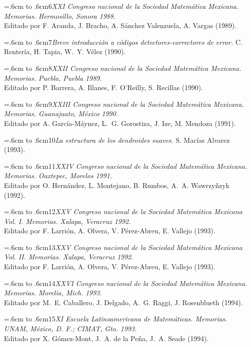 \documentclass[10pt,pagesize]{scrbook}
\numberwithin{equation}{chapter}
\def\bibl#1{\hangindent=.6cm \noindent \hbox to .6cm{#1\hfill}}
\begin{document}
\bibl{\hbox{\hskip3.5pt}6}{\itshape XXI Congreso nacional de la Sociedad Matemática
Mexicana. Memorias. Hermosillo, Sonora 1988.} \\
Editado por F. Aranda, J. Bracho, A. Sánchez Valenzuela, A. Vargas
(1989). %

\bibl{\hbox{\hskip3.5pt}7}{\itshape Breve introducción a códigos detectores-correctores
de error.} 
C. Rentería, H. Tapia, W.$\!$~Y. Vélez (1990). %

\bibl{\hbox{\hskip3.5pt}8}{\itshape XXII Congreso nacional de la Sociedad Matemática
Mexicana. Memorias. Puebla, Puebla 1989.}\\
Editado por P. Barrera, A. Illanes, F. O'Reilly, S. Recillas (1990).

\bibl{\hbox{\hskip3.5pt}9}{\itshape XXIII Congreso nacional de la Sociedad Matemática
Mexicana. Memorias. Guanajuato, México 1990.}\\ 
Editado por A. García-Máynez, L.$\!$~G. Gorostiza, J.
Ize, M. Mendoza (1991). %

\bibl{10}{\itshape La estructura de los dendroides suaves.}
S. Macías Alvarez (1993). %

\bibl{11}{\itshape XXIV Congreso nacional de la Sociedad Matemática
Mexicana. Memorias. Oaxtepec, Morelos 1991.} \\
Editado por O. Hernández, L. Montejano, B. Rumbos, A.$\!$~A.
Wawrzyñzyk (1992). %

\bibl{12}{\itshape XXV Congreso nacional de la Sociedad Matemática
Mexicana Vol. I. Memorias. Xalapa, Veracruz 1992.} \\ 
Editado por F. Larrión, A. Olvera, V. Pérez-Abreu, E. Vallejo
(1993). %

\bibl{13}{\itshape XXV Congreso nacional de la Sociedad Matemática
Mexicana Vol. II. Memorias. Xalapa, Veracruz 1992.} \\
Editado por F. Larrión, A. Olvera, V. Pérez-Abreu, E. Vallejo
(1993). %

\bibl{14}{\itshape XXVI Congreso nacional de la Sociedad Matemática
Mexicana. Memorias. Morelia, Mich. 1993.} \\
Editado por M.$\!$~E. Caballero, J. Delgado, A.$\!$~G. Raggi, J.
Rosenblueth (1994). %

\bibl{15}{\itshape XI Escuela Latinoamericana de Matemáticas. Memorias.
UNAM, México, D.$\!$ F.; CIMAT, Gto. 1993.} \\
Editado por X. Gómez-Mont, J.$\!$~A. de la Peña, J.$\!$~A. Seade
(1994). %
\end{document}
